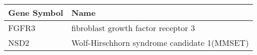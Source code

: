 \begin{tabular}{ll}
\toprule
Gene Symbol &                                        Name \\
\midrule
      FGFR3 &         fibroblast growth factor receptor 3 \\
       NSD2 & Wolf-Hirschhorn syndrome candidate 1(MMSET) \\
\bottomrule
\end{tabular}
